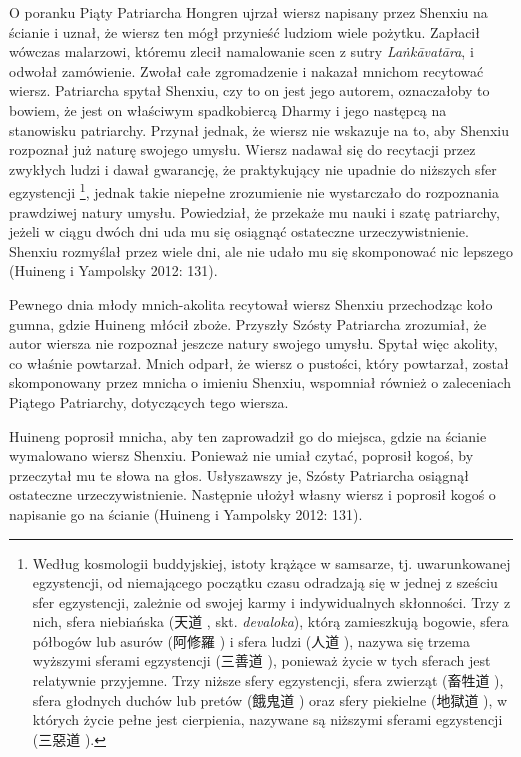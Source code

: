 O poranku Piąty Patriarcha Hongren ujrzał wiersz napisany przez Shenxiu na ścianie i uznał, że wiersz ten mógł przynieść ludziom wiele pożytku. Zapłacił wówczas malarzowi, któremu zlecił namalowanie scen z sutry \textit{La\.nkāvatāra}, i odwołał zamówienie.
Zwołał całe zgromadzenie i nakazał mnichom recytować wiersz. Patriarcha spytał Shenxiu, czy to on jest jego autorem, oznaczałoby to bowiem, że jest on właściwym spadkobiercą Dharmy i jego następcą na stanowisku patriarchy.
Przynał jednak, że wiersz nie wskazuje na to, aby Shenxiu rozpoznał już naturę swojego umysłu. Wiersz nadawał się do recytacji przez zwykłych ludzi i dawał gwarancję, że praktykujący nie upadnie do niższych sfer egzystencji%
\footnote{Według kosmologii buddyjskiej, istoty krążące w samsarze, tj. uwarunkowanej egzystencji, od niemającego początku czasu odradzają się w jednej z sześciu sfer egzystencji, zależnie od swojej karmy i indywidualnych skłonności. Trzy z nich, sfera niebiańska (天道 , skt. \textit{devaloka}), którą zamieszkują bogowie, sfera półbogów lub asurów (阿修羅 ) i sfera ludzi (人道 ), nazywa się trzema wyższymi sferami egzystencji (三善道 ), ponieważ życie w tych sferach jest relatywnie przyjemne. Trzy niższe sfery egzystencji, sfera zwierząt (畜牲道 ), sfera głodnych duchów lub pretów (餓鬼道 ) oraz sfery piekielne (地獄道 ), w których życie pełne jest cierpienia, nazywane są niższymi sferami egzystencji (三惡道 ).},
jednak takie niepełne zrozumienie nie wystarczało do rozpoznania prawdziwej natury umysłu.
Powiedział, że przekaże mu nauki i szatę patriarchy, jeżeli w ciągu dwóch dni uda mu się osiągnąć ostateczne urzeczywistnienie.
Shenxiu rozmyślał przez wiele dni, ale nie udało mu się skomponować nic lepszego
(Huineng i Yampolsky 2012: 131).

Pewnego dnia młody mnich-akolita recytował wiersz Shenxiu przechodząc koło gumna, gdzie Huineng młócił zboże. Przyszły Szósty Patriarcha zrozumiał, że autor wiersza nie rozpoznał jeszcze natury swojego umysłu. Spytał więc akolity, co właśnie powtarzał. Mnich odparł, że wiersz o pustości, który powtarzał, został skomponowany przez mnicha o imieniu Shenxiu, wspomniał również o zaleceniach Piątego Patriarchy, dotyczących tego wiersza.

Huineng poprosił mnicha, aby ten zaprowadził go do miejsca, gdzie na ścianie wymalowano wiersz Shenxiu. Ponieważ nie umiał czytać, poprosił kogoś, by przeczytał mu te słowa na głos. Usłyszawszy je, Szósty Patriarcha osiągnął ostateczne urzeczywistnienie. Następnie ułożył własny wiersz i poprosił kogoś o napisanie go na ścianie (Huineng i Yampolsky 2012: 131).

